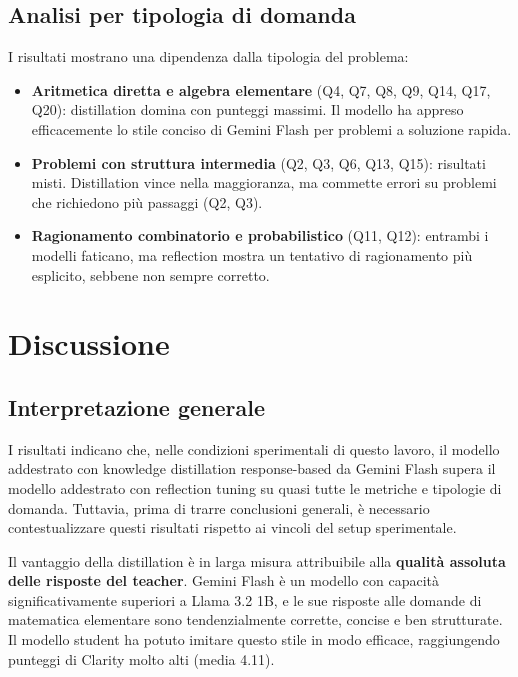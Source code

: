 \subsection{Analisi per tipologia di domanda}

I risultati mostrano una dipendenza dalla tipologia del problema:

\begin{itemize}
  \item \textbf{Aritmetica diretta e algebra elementare} (Q4, Q7, Q8,
    Q9, Q14, Q17, Q20): distillation domina con punteggi massimi.
    Il modello ha appreso efficacemente lo stile conciso di Gemini Flash
    per problemi a soluzione rapida.

  \item \textbf{Problemi con struttura intermedia} (Q2, Q3, Q6, Q13,
    Q15): risultati misti. Distillation vince nella maggioranza, ma
    commette errori su problemi che richiedono più passaggi (Q2, Q3).

  \item \textbf{Ragionamento combinatorio e probabilistico} (Q11, Q12):
    entrambi i modelli faticano, ma reflection mostra un tentativo
    di ragionamento più esplicito, sebbene non sempre corretto.
\end{itemize}

\FloatBarrier
\section{Discussione}
\label{sec:discussione}

\subsection{Interpretazione generale}

I risultati indicano che, nelle condizioni sperimentali di questo
lavoro, il modello addestrato con knowledge distillation response-based
da Gemini Flash supera il modello addestrato con reflection tuning
su quasi tutte le metriche e tipologie di domanda. Tuttavia,
prima di trarre conclusioni generali, è necessario contestualizzare
questi risultati rispetto ai vincoli del setup sperimentale.

Il vantaggio della distillation è in larga misura attribuibile alla
\textbf{qualità assoluta delle risposte del teacher}. Gemini Flash
è un modello con capacità significativamente superiori a Llama
3.2 1B, e le sue risposte alle domande di matematica elementare sono
tendenzialmente corrette, concise e ben strutturate. Il modello
student ha potuto imitare questo stile in modo efficace, raggiungendo
punteggi di Clarity molto alti (media 4.11).

